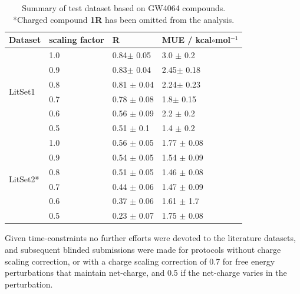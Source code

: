 \documentclass{svjour3}                     %
\begin{document}
\begin{table}[]
\centering
\begin{tabular}{|l|l|l|l|}
\hline
Dataset                  & scaling factor & R               & MUE / kcal$\circ$mol$^{-1}$ \\ \hline
\multirow{6}{*}{LitSet1} & 1.0              & 0.84$\pm$ 0.05  & 3.0 $\pm$ 0.2               \\ \cline{2-4} 
                         & 0.9            & 0.83$\pm$ 0.04  & 2.45$\pm$ 0.18              \\ \cline{2-4} 
                         & 0.8            & 0.81 $\pm$ 0.04 & 2.24$\pm$ 0.23              \\ \cline{2-4} 
                         & 0.7            & 0.78 $\pm$ 0.08 & 1.8$\pm$ 0.15               \\ \cline{2-4} 
                         & 0.6            & 0.56 $\pm$ 0.09 & 2.2 $\pm$ 0.2               \\ \cline{2-4} 
                         & 0.5            & 0.51 $\pm$ 0.1  & 1.4 $\pm$ 0.2               \\ \hline
\multirow{6}{*}{LitSet2*} & 1.0              & 0.56 $\pm$ 0.05 & 1.77 $\pm$ 0.08             \\ \cline{2-4} 
                         & 0.9            & 0.54 $\pm$ 0.05 & 1.54 $\pm$ 0.09             \\ \cline{2-4} 
                         & 0.8            & 0.51 $\pm$ 0.05 & 1.46 $\pm$ 0.08             \\ \cline{2-4} 
                         & 0.7            & 0.44 $\pm$ 0.06 & 1.47 $\pm$ 0.09             \\ \cline{2-4} 
                         & 0.6            & 0.37 $\pm$ 0.06 & 1.61 $\pm$ 1.7              \\ \cline{2-4} 
                         & 0.5            & 0.23 $\pm$ 0.07 & 1.75 $\pm$ 0.08             \\ \hline
\end{tabular}
\caption{Summary of test dataset based on GW4064 compounds. *Charged compound \textbf{1R} has been omitted from the analysis. }
\label{tab:lit-data}
\end{table}

Given time-constraints no further efforts were devoted to the literature datasets, and subsequent blinded submissions were made for protocols without charge scaling correction, or with a charge scaling correction of 0.7 for free energy perturbations that maintain net-charge, and 0.5 if the net-charge varies in the perturbation.
\end{document}
